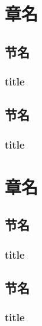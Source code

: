 \chapter{章名}
\section{节名}
\subsection{title}
\section{节名}
\subsection{title}

\chapter{章名}
\section{节名}
\subsection{title}
\section{节名}
\subsection{title}
